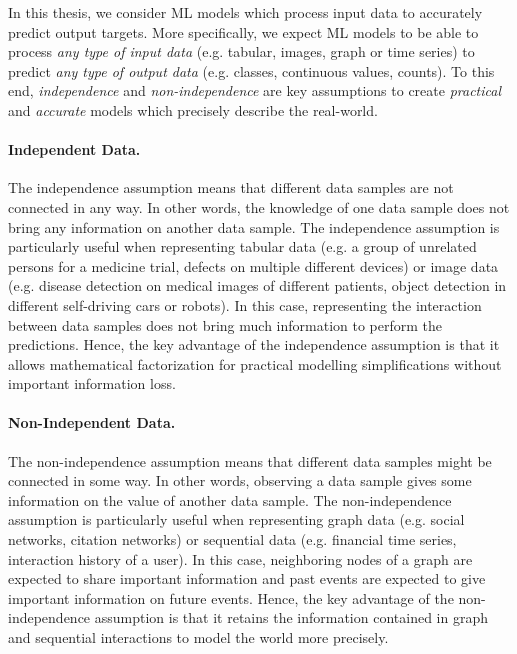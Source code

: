 In this thesis, we consider ML models which process input data to accurately predict output targets. 
More specifically, we expect ML models to be able to process \emph{any type of input data} (e.g. tabular, images, graph or time series) to predict \emph{any type of output data} (e.g. classes, continuous values, counts).
To this end, \emph{independence} and \emph{non-independence} are key assumptions to create \emph{practical} and \emph{accurate} models which precisely describe the real-world. 

\paragraph*{Independent Data.} The independence assumption means that different data samples are not connected in any way. In other words, the knowledge of one data sample does not bring any information on another data sample.
The independence assumption is particularly useful when representing tabular data \cite{raschka2022chronology} (e.g. a group of unrelated persons for a medicine trial, defects on multiple different devices) or image data \cite{lu2020survey, litjens2017survey} (e.g. disease detection on medical images of different patients, object detection in different self-driving cars or robots).
In this case, representing the interaction between data samples does not bring much information to perform the predictions.
Hence, the key advantage of the independence assumption is that it allows mathematical factorization for practical modelling simplifications \citep{bishop} without important information loss.

\paragraph*{Non-Independent Data.} The non-independence assumption means that different data samples might be connected in some way. In other words, observing a data sample gives some information on the value of another data sample.
The non-independence assumption is particularly useful when representing graph data \cite{GNNBook2022} (e.g. social networks, citation networks) or sequential data \cite{shchur2021review, Dietterich2002Machine} (e.g. financial time series, interaction history of a user).
In this case, neighboring nodes of a graph are expected to share important information and past events are expected to give important information on future events.
Hence, the key advantage of the non-independence assumption is that it retains the information contained in graph and sequential interactions to model the world more precisely.

